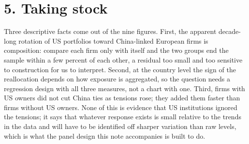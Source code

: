 \documentclass[11pt]{article}
\begin{document}
\section*{5. Taking stock}

Three descriptive facts come out of the nine figures. First, the apparent
decade-long rotation of US portfolios toward China-linked European firms is
composition: compare each firm only with itself and the two groups end the
sample within a few percent of each other, a residual too small and too
sensitive to construction for us to interpret. Second, at the country level the
sign of the reallocation depends on how exposure is aggregated, so the
question needs a regression design with all three measures, not a chart with
one. Third, firms with US owners did not cut China ties as tensions rose;
they added them faster than firms without US owners. None of this is
evidence that US institutions ignored the tensions; it says that whatever
response exists is small relative to the trends in the data and will have to
be identified off sharper variation than raw levels, which is what the
panel design this note accompanies is built to do.
\end{document}
